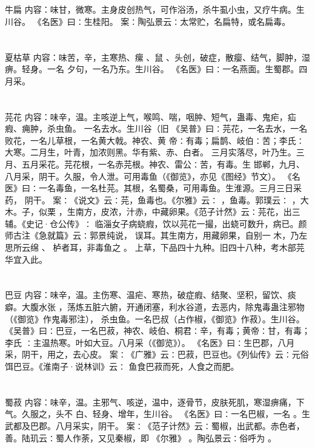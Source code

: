 \documentclass[12pt,UTF8]{ctexbook}
\begin{document}
\section{}牛扁
内容：味甘，微寒。主身皮创热气，可作浴汤，杀牛虱小虫，又疗牛病。生川谷。 
《名医》曰∶生桂阳。 
案∶陶弘景云∶太常贮，名扁特，或名扁毒。 


\section{}夏枯草
内容：味苦，辛，主寒热、瘰 、鼠 、头创，破症，散瘿、结气，脚肿，湿痹。轻身。一名 
夕句，一名乃东。生川谷。 
《名医》曰∶一名燕面。生蜀郡。四月采。 


\section{}芫花
内容：味辛，温。主咳逆上气，喉鸣、喘，咽肿、短气，蛊毒、鬼疟，疝瘕、痈肿，杀虫鱼。 
一名去水。生川谷（旧 
《吴普》曰∶芫花，一名去水，一名败花，一名儿草根，一名黄大戟。神农、黄 
帝∶有毒；扁鹊、岐伯∶苦；李氏∶大寒。二月生，叶青，加浓则黑。华有紫、赤、白者。 
三月实落尽，叶乃生。三月、五月采花。芫花根，一名赤芫根。神农、雷公∶苦，有毒。生 
邯郸，九月、八月采，阴干。久服，令人泄。可用毒鱼（《御览》，亦见《图经》节文）。 
《名医》曰∶一名毒鱼，一名杜芫。其根，名蜀桑，可用毒鱼。生淮源。三月三日采药， 
阴干。 
案∶《说文》云∶芫，鱼毒也。《尔雅》云∶ ，鱼毒。郭璞云∶ ，大木。子，似栗 
，生南方，皮浓，汁赤，中藏卵果。《范子计然》云∶芫花，出三辅。《史记·仓公传》∶ 
临淄女子病蛲瘕，饮以芫花一撮，出蛲可数升，病已。颜师古注《急就篇》云∶郭景纯说， 
误耳。其生南方，用藏卵果，自别一 木，乃左思所云绵 、 栌者耳，非毒鱼之 。 
上草，下品四十九种。旧四十八种，考木部芫华宜入此。 


\section{}巴豆
内容：味辛，温。主伤寒、温疟、寒热，破症瘕、结聚、坚积，留饮、痰癖。大腹水张 
，荡炼五脏六腑，开通闭塞，利水谷道，去恶内，除鬼毒蛊注邪物（《御览》作鬼毒邪注）， 
杀虫鱼。一名巴叔（占作椒，《御览》作菽）。生川谷。 
《吴普》曰∶巴豆，一名巴菽，神农、岐伯、桐君∶辛，有毒；黄帝∶甘，有毒；李氏 
∶主温热寒。叶如大豆。八月采（《御览》）。 
《名医》曰∶生巴郡，八月采，阴干，用之，去心皮。 
案∶《广雅》云∶巴菽，巴豆也。《列仙传》云∶元俗饵巴豆。《淮南子·说林训》云∶ 
鱼食巴菽而死，人食之而肥。 


\section{}蜀菽
内容：味辛，温。主邪气、咳逆，温中，逐骨节，皮肤死肌，寒湿痹痛，下气。久服之，头不 
白、轻身、增年，生川谷。 
《名医》曰∶一名巴椒，一名 。生武都及巴郡。八月采实，阴干。 
案∶《范子计然》云∶蜀椒，出武都。赤色者，善。陆玑云∶蜀人作荼，又见秦椒，即 
《尔雅》 。陶弘景云∶俗呼为 。 
\end{document}
